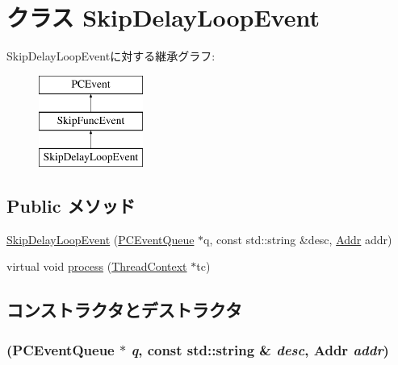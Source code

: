 \hypertarget{classLinuxMipsSystem_1_1SkipDelayLoopEvent}{
\section{クラス SkipDelayLoopEvent}
\label{classLinuxMipsSystem_1_1SkipDelayLoopEvent}
}
SkipDelayLoopEventに対する継承グラフ:\begin{figure}[H]
\begin{center}
\leavevmode
\includegraphics[height=3cm]{classLinuxMipsSystem_1_1SkipDelayLoopEvent}
\end{center}
\end{figure}
\subsection*{Public メソッド}
\begin{DoxyCompactItemize}
\item 
\hyperlink{classLinuxMipsSystem_1_1SkipDelayLoopEvent_a7896e57760ebceb961da61bacedabbdc}{SkipDelayLoopEvent} (\hyperlink{classPCEventQueue}{PCEventQueue} $\ast$q, const std::string \&desc, \hyperlink{base_2types_8hh_af1bb03d6a4ee096394a6749f0a169232}{Addr} addr)
\item 
virtual void \hyperlink{classLinuxMipsSystem_1_1SkipDelayLoopEvent_ad66a9d5ec7cfe597b848a17c0df5cc28}{process} (\hyperlink{classThreadContext}{ThreadContext} $\ast$tc)
\end{DoxyCompactItemize}


\subsection{コンストラクタとデストラクタ}
\hypertarget{classLinuxMipsSystem_1_1SkipDelayLoopEvent_a7896e57760ebceb961da61bacedabbdc}{
\subsubsection[{SkipDelayLoopEvent}]{ ({\bf PCEventQueue} $\ast$ {\em q}, \/  const std::string \& {\em desc}, \/  {\bf Addr} {\em addr})}}
\label{classLinuxMipsSystem_1_1SkipDelayLoopEvent_a7896e57760ebceb961da61bacedabbdc}



